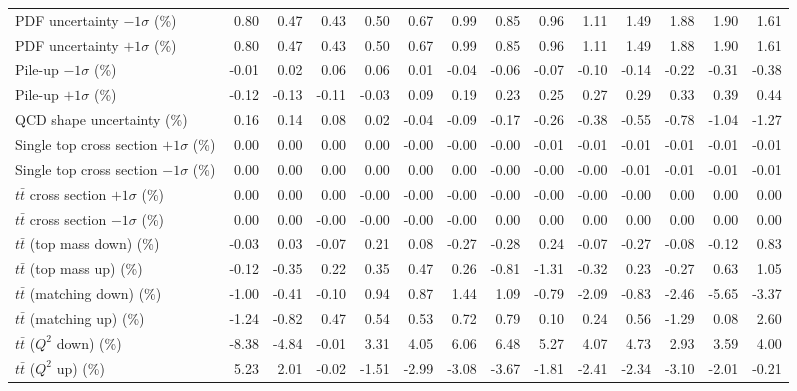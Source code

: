 \begin{table}[htbp]
{\begin{tabular}{lrrrrrrrrrrrrr}
PDF uncertainty $-1\sigma$ (\%) & 0.80 & 0.47 & 0.43 & 0.50 & 0.67 & 0.99 & 0.85 & 0.96 & 1.11 & 1.49 & 1.88 & 1.90 & 1.61 \\ 
PDF uncertainty $+1\sigma$ (\%) & 0.80 & 0.47 & 0.43 & 0.50 & 0.67 & 0.99 & 0.85 & 0.96 & 1.11 & 1.49 & 1.88 & 1.90 & 1.61 \\ 
Pile-up $-1\sigma$ (\%) & -0.01 & 0.02 & 0.06 & 0.06 & 0.01 & -0.04 & -0.06 & -0.07 & -0.10 & -0.14 & -0.22 & -0.31 & -0.38 \\ 
Pile-up $+1\sigma$ (\%) & -0.12 & -0.13 & -0.11 & -0.03 & 0.09 & 0.19 & 0.23 & 0.25 & 0.27 & 0.29 & 0.33 & 0.39 & 0.44 \\ 
QCD shape uncertainty (\%) & 0.16 & 0.14 & 0.08 & 0.02 & -0.04 & -0.09 & -0.17 & -0.26 & -0.38 & -0.55 & -0.78 & -1.04 & -1.27 \\ 
Single top cross section $+1\sigma$ (\%) & 0.00 & 0.00 & 0.00 & 0.00 & -0.00 & -0.00 & -0.00 & -0.01 & -0.01 & -0.01 & -0.01 & -0.01 & -0.01 \\ 
Single top cross section $-1\sigma$ (\%) & 0.00 & 0.00 & 0.00 & 0.00 & 0.00 & 0.00 & -0.00 & -0.00 & -0.00 & -0.01 & -0.01 & -0.01 & -0.01 \\ 
$t\bar{t}$ cross section $+1\sigma$ (\%) & 0.00 & 0.00 & 0.00 & -0.00 & -0.00 & -0.00 & -0.00 & -0.00 & -0.00 & -0.00 & 0.00 & 0.00 & 0.00 \\ 
$t\bar{t}$ cross section $-1\sigma$ (\%) & 0.00 & 0.00 & -0.00 & -0.00 & -0.00 & -0.00 & 0.00 & 0.00 & 0.00 & 0.00 & 0.00 & 0.00 & 0.00 \\ 
$t\bar{t}$ (top mass down) (\%) & -0.03 & 0.03 & -0.07 & 0.21 & 0.08 & -0.27 & -0.28 & 0.24 & -0.07 & -0.27 & -0.08 & -0.12 & 0.83 \\ 
$t\bar{t}$ (top mass up) (\%) & -0.12 & -0.35 & 0.22 & 0.35 & 0.47 & 0.26 & -0.81 & -1.31 & -0.32 & 0.23 & -0.27 & 0.63 & 1.05 \\ 
$t\bar{t}$ (matching down) (\%) & -1.00 & -0.41 & -0.10 & 0.94 & 0.87 & 1.44 & 1.09 & -0.79 & -2.09 & -0.83 & -2.46 & -5.65 & -3.37 \\ 
$t\bar{t}$ (matching up) (\%) & -1.24 & -0.82 & 0.47 & 0.54 & 0.53 & 0.72 & 0.79 & 0.10 & 0.24 & 0.56 & -1.29 & 0.08 & 2.60 \\ 
$t\bar{t}$ ($Q^{2}$ down) (\%) & -8.38 & -4.84 & -0.01 & 3.31 & 4.05 & 6.06 & 6.48 & 5.27 & 4.07 & 4.73 & 2.93 & 3.59 & 4.00 \\ 
$t\bar{t}$ ($Q^{2}$ up) (\%) & 5.23 & 2.01 & -0.02 & -1.51 & -2.99 & -3.08 & -3.67 & -1.81 & -2.41 & -2.34 & -3.10 & -2.01 & -0.21 \\ 

\end{tabular}}
\end{table}
